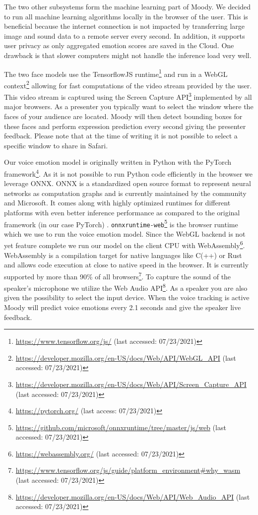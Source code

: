 The two other subsystems form the machine learning part of Moody. We decided to run all machine learning algorithms locally in the browser of the user. This is beneficial because the internet connection is not impacted by transferring large image and sound data to a remote server every second. In addition, it supports user privacy as only aggregated emotion scores are saved in the Cloud. One drawback is that slower computers might not handle the inference load very well.

The two face models use the TensorflowJS runtime\footnote{\url{https://www.tensorflow.org/js/} (last accessed: 07/23/2021)} and run in a WebGL context\footnote{\url{https://developer.mozilla.org/en-US/docs/Web/API/WebGL_API} (last accessed: 07/23/2021)} allowing for fast computations of the video stream provided by the user. This video stream is captured using the Screen Capture API\footnote{\url{https://developer.mozilla.org/en-US/docs/Web/API/Screen_Capture_API} (last accessed: 07/23/2021)} implemented by all major browsers. As a presenter you typically want to select the window where the faces of your audience are located. Moody will then detect bounding boxes for these faces and perform expression prediction every second giving the presenter feedback. Please note that at the time of writing it is not possible to select a specific window to share in Safari.

Our voice emotion model is originally written in Python with the PyTorch framework\footnote{\url{https://pytorch.org/} (last access: 07/23/2021)}. As it is not possible to run Python code efficiently in the browser we leverage ONNX. ONNX is a standardized open source format to represent neural networks as computation graphs and is currently maintained by the community and Microsoft. It comes along with highly optimized runtimes for different platforms with even better inference performance as compared to the original framework (in our case PyTorch) \cite{developers_onnx_2021}. \texttt{onnxruntime-web}\footnote{\url{https://github.com/microsoft/onnxruntime/tree/master/js/web} (last accessed: 07/23/2021)} is the browser runtime which we use to run the voice emotion model. Since the WebGL backend is not yet feature complete we run our model on the client CPU with WebAssembly\footnote{\url{https://webassembly.org/} (last accessed: 07/23/2021)}. WebAssembly is a compilation target for native languages like C(++) or Rust and allows code execution at close to native speed in the browser. It is currently supported by more than 90\% of all browsers\footnote{\url{https://www.tensorflow.org/js/guide/platform_environment#why_wasm} (last accessed: 07/23/2021)}. To capture the sound of the speaker’s microphone we utilize the Web Audio API\footnote{\url{https://developer.mozilla.org/en-US/docs/Web/API/Web_Audio_API} (last accessed: 07/23/2021)}. As a speaker you are also given the possibility to select the input device. When the voice tracking is active Moody will predict voice emotions every 2.1 seconds and give the speaker live feedback.


